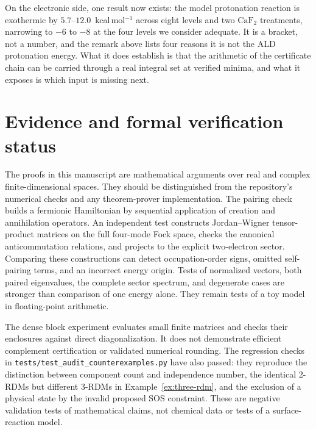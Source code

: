 \documentclass[11pt,a4paper]{article}
\theoremstyle{plain}
\theoremstyle{definition}
\theoremstyle{remark}
\providecommand{\path}[1]{\texttt{#1}}
\begin{document}
On the electronic side, one result now exists: the model protonation reaction is
exothermic by $5.7$--$12.0$~kcal\,mol$^{-1}$ across eight levels and two
$\mathrm{CaF_2}$ treatments, narrowing to $-6$ to $-8$ at the four levels we
consider adequate. It is a bracket, not a number, and the remark above lists four
reasons it is not the ALD protonation energy. What it does establish is that the
arithmetic of the certificate chain can be carried through a real integral set at
verified minima, and what it exposes is which input is missing next.


\section{Evidence and formal verification status}
\label{sec:formalization}
The proofs in this manuscript are mathematical arguments over real and
complex finite-dimensional spaces. They should be distinguished from the
repository's numerical checks and any theorem-prover implementation.
The pairing check builds a fermionic Hamiltonian by sequential application
of creation and annihilation operators. An independent test constructs
Jordan--Wigner tensor-product matrices on the full four-mode Fock space,
checks the canonical anticommutation relations, and projects to the explicit
two-electron sector. Comparing these constructions can detect occupation-order
signs, omitted self-pairing terms, and an incorrect energy origin. Tests of
normalized vectors, both paired eigenvalues, the complete sector spectrum, and
degenerate cases are stronger than comparison of one energy alone. They remain
tests of a toy model in floating-point arithmetic.

The dense block experiment evaluates small finite matrices and checks their
enclosures against direct diagonalization. It does not demonstrate efficient
complement certification or validated numerical rounding. The regression
checks in \path{tests/test_audit_counterexamples.py} have also passed: they
reproduce the distinction between component count and independence number,
the identical 2-RDMs but different 3-RDMs in Example~\ref{ex:three-rdm},
and the exclusion of a physical state by the invalid proposed SOS constraint.
These are negative validation tests of mathematical claims, not chemical data
or tests of a surface-reaction model.
\end{document}
